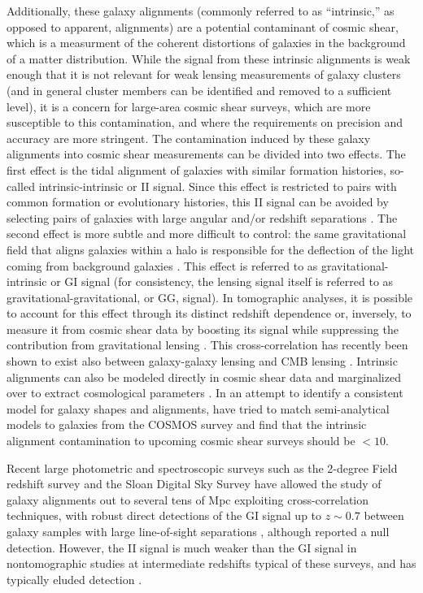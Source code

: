 Additionally, these galaxy alignments (commonly referred to as ``intrinsic,'' as opposed to 
apparent, alignments) are a potential contaminant of cosmic shear, which is a measurment of 
the coherent distortions of galaxies in the background of a matter distribution. While the signal 
from these intrinsic alignments is weak enough that it is not relevant for weak lensing 
measurements of galaxy clusters (and in general cluster members can be identified and removed to a 
sufficient level), it is a concern for large-area cosmic shear surveys, which are more susceptible 
to this contamination, and where the requirements on precision and accuracy are more stringent. The 
contamination induced by these galaxy alignments into cosmic shear measurements can be divided into 
two effects. The first effect is the tidal alignment of galaxies with similar formation histories, 
so-called intrinsic-intrinsic or II signal. Since this effect is restricted to pairs with common 
formation or evolutionary histories, this II signal can be avoided by selecting pairs of galaxies 
with large angular and/or redshift separations \citep[e.g.,][]{king02,heymans03,heymans04}. The 
second effect is more subtle and more difficult to control: the same gravitational field that 
aligns galaxies within a halo is responsible for the deflection of the light coming from background 
galaxies \citep{hirata04}. This effect is referred to as gravitational-intrinsic or GI signal (for 
consistency, the lensing signal itself is referred to as gravitational-gravitational, or GG, 
signal). In tomographic analyses, it is possible to account for this effect through its distinct 
redshift dependence \citep{king05,joachimi08,zhang10_selfcal,zhang10_prop} or, inversely, to measure it from 
cosmic shear data by boosting its signal while suppressing the contribution from gravitational 
lensing \citep{joachimi10_boost}. This cross-correlation has recently been shown to exist also between 
galaxy-galaxy lensing and CMB lensing \citep{hall14,troxel14}. Intrinsic alignments can also be 
modeled directly in cosmic shear data and marginalized over to extract cosmological parameters 
\citep{joachimi10_bridle,heymans13}. In an attempt to identify a consistent model for galaxy shapes and 
alignments, \cite{joachimi13_cosmos,joachimi13_contam} have tried to match semi-analytical models to galaxies 
from the COSMOS survey \citep{scoville07} and find that the intrinsic alignment contamination to 
upcoming cosmic shear surveys should be $<10$\percent.

Recent large photometric and spectroscopic surveys such as the 2-degree Field redshift survey 
\citep[2dF,][]{colless01} and the Sloan Digital Sky Survey \citep[SDSS,][]{york00} have allowed the 
study of galaxy alignments out to several tens of Mpc exploiting cross-correlation techniques, with 
robust direct detections of the GI signal up to $z\sim0.7$ between galaxy samples with large 
line-of-sight separations \citep{mandelbaum06_ia,hirata07,joachimi11}, although 
\cite{mandelbaum11} reported a null detection. However, the II signal is much weaker than the GI signal in 
nontomographic studies at intermediate redshifts typical of these surveys, and has typically 
eluded detection \citep[e.g.,][]{mandelbaum06_ia,mandelbaum11,blazek12}.

